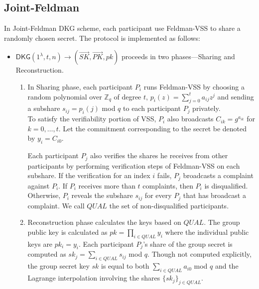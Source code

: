 \documentclass[letterpaper,twocolumn,10pt]{article}
\theoremstyle{definition}
\theoremstyle{remark}
\begin{document}
\subsection{Joint-Feldman}
\label{appendix:jointFeldman}
In Joint-Feldman DKG scheme, each participant use Feldman-VSS to share a randomly chosen secret. The protocol is implemented as follows:
\begin{itemize}
    \item $\mathsf{DKG}(1^{\lambda}, t, n) \rightarrow (\vec{SK}, \vec{PK}, pk)$  proceeds in two phases---Sharing and Reconstruction.
    \begin{enumerate}
        \item In Sharing phase, each participant $P_i$ runs Feldman-VSS by choosing a random polynomial over $\mathbb{Z}_q$ of degree $t$, $p_i(z) = \sum_{j = 0}^{t} a_{ij} z^j$ and sending a subshare $s_{ij} = p_i(j)$ mod $q$ to each participant $P_j$ privately. \\
        To satisfy the verifiability portion of VSS, $P_i$ also broadcasts $C_{ik} = g^{a_{ik}}$ for $k = 0, \ldots, t$. Let the commitment corresponding to the secret be denoted by $y_i = C_{i0}$.
        
        Each participant $P_j$ also verifies the shares he receives from other participants by performing verification steps of Feldman-VSS on each subshare. If the verification for an index $i$ fails, $P_j$ broadcasts a complaint against $P_i$. If $P_i$ receives more than $t$ complaints, then $P_i$ is disqualified. Otherwise, $P_i$ reveals the subshare $s_{ij}$ for every $P_j$ that has broadcast a complaint. We call $QUAL$ the set of non-disqualified participants.
        
        \item Reconstruction phase calculates the keys based on $QUAL$.
        The group public key is calculated as $pk = \prod_{i \in QUAL} y_i$ where the individual public keys are $pk_i = y_i$. Each participant $P_j$'s share of the group secret is  computed as $sk_j = \sum_{i \in QUAL} s_{ij}$ mod $q$.  Though not computed explicitly, the group secret key $sk$ is equal to both $\sum_{i \in QUAL} a_{i0}$ mod $q$ and the Lagrange interpolation involving the shares $\{sk_j\}_{j \in QUAL}$.
    \end{enumerate}
\end{itemize}
\end{document}
